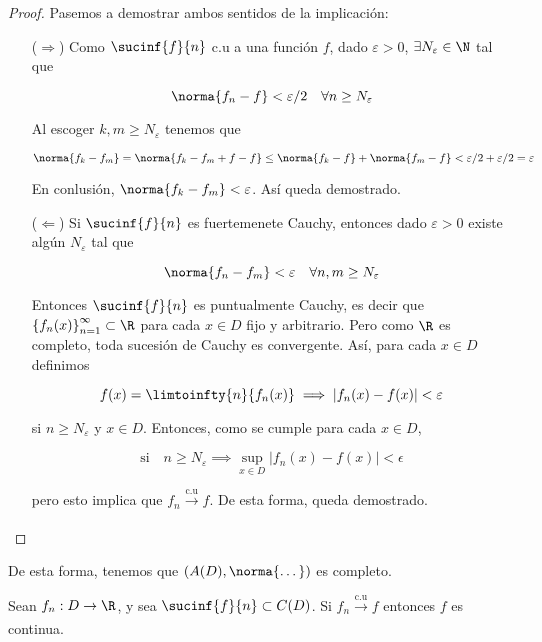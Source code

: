 \begin{proof}
    Pasemos a demostrar ambos sentidos de la implicación:
    
    \begin{itemize}
        \item[($\Rightarrow$)] Como $\sucinf{f}{n}$ c.u a una función $f$, dado $\varepsilon > 0$, $\exists N_{\varepsilon} \in \N$ tal que
        
        \[
        \norma{f_n - f} < \varepsilon/2 \quad \forall n \geq N_{\varepsilon}
        \]
        
        Al escoger $k,m \geq N_{\varepsilon}$ tenemos que
        
        \[
        \norma{f_k - f_m} = \norma{f_k - f_m + f - f} \leq \norma{f_k - f} + \norma{f_m - f} < \varepsilon/2 + \varepsilon/2 = \varepsilon
        \]
        
        En conlusión, $\norma{f_k - f_m} < \varepsilon$. Así queda demostrado.
        
        \item[($\Leftarrow$)] Si $\sucinf{f}{n}$ es fuertemenete Cauchy, entonces dado $\varepsilon > 0$ existe algún $N_{\varepsilon}$ tal que
        
        \[
        \norma{f_n - f_m} < \varepsilon \quad \forall n,m \geq N_{\varepsilon}
        \]
        
        Entonces $\sucinf{f}{n}$ es puntualmente Cauchy, es decir que $\left\{ f_n(x) \right\}_{n=1}^{\infty} \subset \R$ para cada $x \in D$ fijo y arbitrario. Pero como $\R$ es completo, toda sucesión de Cauchy es convergente. Así, para cada $x \in D$ definimos
        
        \[
        f(x) = \limtoinfty{n}{f_n(x)} \implies \left| f_n(x) - f(x) \right| < \varepsilon
        \]
        
        \noindent si $n \geq N_{\varepsilon}$ y $x \in D$. Entonces, como se cumple para cada $x \in D$,
        
        \[
        \text{si} \quad n \geq N_{\varepsilon} \implies \sup_{x \in D} \left| f_n(x) - f(x) \right| < \epsilon
        \]
        
        \noindent pero esto implica que $f_n \xrightarrow[]{\text{c.u}} f$. De esta forma, queda demostrado.
    \end{itemize}
\end{proof}

De esta forma, tenemos que $(A(D), \norma{\dots})$ es completo.

\begin{teo}
    Sean $f_n: D \rightarrow \R$, y sea $\sucinf{f}{n} \subset C(D)$. Si $f_n \xrightarrow[]{\text{c.u}} f$ entonces $f$ es continua.
\end{teo}

